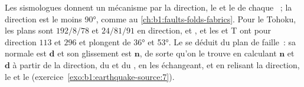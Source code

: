 Les sismologues donnent un mécanisme par la direction, le  et le  de chaque ~;
la direction est le  moins \ang{90}, comme au
\cref{ch:b1:faults-folds-fabrics}. Pour le Tohoku, les plans sont
$192/8/78$ et $24/81/91$ en direction,  et , et les  et T ont pour direction
$113$ et $296$ et plongent de \ang{36} et \ang{53}. Le  se déduit
du plan de faille~: sa normale est $\mathbf d$ et son glissement est $\mathbf n$, de sorte
qu'on le trouve en calculant $\mathbf n$ et $\mathbf d$ à partir de la direction, du 
et du , en les échangeant, et en relisant la direction, le  et le 
(exercice~\ref{exo:b1:earthquake-source:7}).

